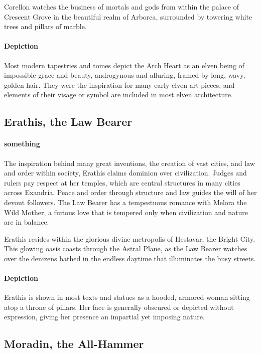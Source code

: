 \documentclass[letterpaper,twocolumn,openany,nodeprecatedcode]{dndbook}
\begin{document}
Corellon watches the business of mortals and gods from within the palace of Crescent
Grove in the beautiful realm of Arborea, surrounded by towering white trees and
pillars of marble.

\paragraph{Depiction}
Most modern tapestries and tomes depict the Arch Heart as an elven being of impossible
grace and beauty, androgynous and alluring, framed by long, wavy, golden hair. They were
the inspiration for many early elven art pieces, and elements of their visage or symbol
are included in most elven architecture.

\subsection{Erathis, the Law Bearer}

\paragraph{something}
The inspiration behind many great inventions, the creation of vast cities, and law and
order within society, Erathis claims dominion over civilization. Judges and rulers pay
respect at her temples, which are central structures in many cities across Exandria.
Peace and order through structure and law guides the will of her devout followers.
The Law Bearer has a tempestuous romance with Melora the Wild Mother, a furious love
that is tempered only when civilization and nature are in balance.

Erathis resides within the glorious divine metropolis of Hestavar, the Bright City.
This glowing oasis coasts through the Astral Plane, as the Law Bearer watches over the
denizens bathed in the endless daytime that illuminates the busy streets.

\paragraph{Depiction}
Erathis is shown in most texts and statues as a hooded, armored woman sitting atop a
throne of pillars. Her face is generally obscured or depicted without expression,
giving her presence an impartial yet imposing nature.

\subsection{Moradin, the All-Hammer}
\end{document}
